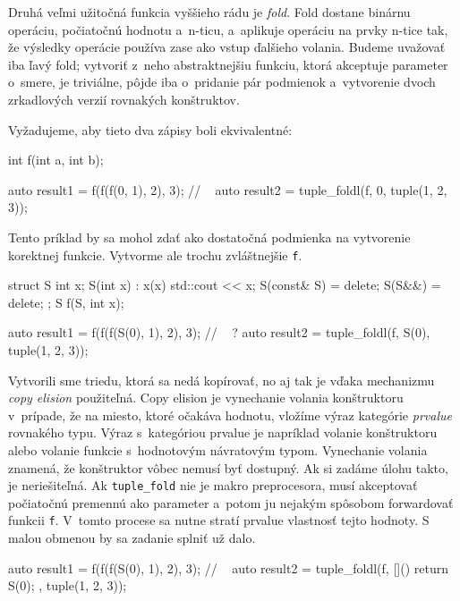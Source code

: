Druhá veľmi užitočná funkcia vyššieho rádu je \emph{fold}. Fold dostane binárnu operáciu, počiatočnú hodnotu a~n-ticu, a~aplikuje operáciu na prvky n-tice tak, že výsledky operácie používa zase ako vstup ďalšieho volania. Budeme uvažovať iba ľavý fold; vytvoriť z~neho abstraktnejšiu funkciu, ktorá akceptuje parameter o~smere, je triviálne, pôjde iba o~pridanie pár podmienok a~vytvorenie dvoch zrkadlových verzií rovnakých konštruktov. 

Vyžadujeme, aby tieto dva zápisy boli ekvivalentné:
\begin{code}
int f(int a, int b);

auto result1 = f(f(f(0, 1), 2), 3);
// ~
auto result2 = tuple_foldl(f, 0, tuple(1, 2, 3));
\end{code}
Tento príklad by sa mohol zdať ako dostatočná podmienka na vytvorenie korekt\-nej funkcie. Vytvorme ale trochu zvláštnejšie \texttt{f}.
\begin{code}
struct S
{   int x;
    S(int x) : x(x) { std::cout << x; }
    S(const& S) = delete;
    S(S&&) = delete;
};
S f(S, int x);

auto result1 = f(f(f(S(0), 1), 2), 3);
// ~ ?
auto result2 = tuple_foldl(f, S(0), tuple(1, 2, 3));
\end{code}
Vytvorili sme triedu, ktorá sa nedá kopírovať, no aj tak je vďaka mechanizmu \emph{copy elision} použiteľná. Copy elision je vynechanie volania konštruktoru v~prípade, že na miesto, ktoré očakáva hodnotu, vložíme výraz kategórie \emph{prvalue} rovnakého typu. Výraz s~kategóriou prvalue je napríklad volanie konštruktoru alebo volanie funkcie s~hodnotovým návratovým typom. Vynechanie volania znamená, že konštruktor vôbec nemusí byť dostupný. Ak si zadáme úlohu takto, je neriešiteľná. Ak \texttt{tuple\_fold} nie je makro preprocesora, musí akceptovať počiatočnú premennú ako parameter a~potom ju nejakým spôsobom forwardovať funkcii \texttt{f}. V~tomto procese sa nutne stratí prvalue vlastnosť tejto hodnoty. S malou obmenou by sa zadanie splniť už dalo.
\begin{code}
auto result1 = f(f(f(S(0), 1), 2), 3);
// ~
auto result2 = tuple_foldl(f, [](){ return S(0); }, tuple(1, 2, 3));
\end{code}

